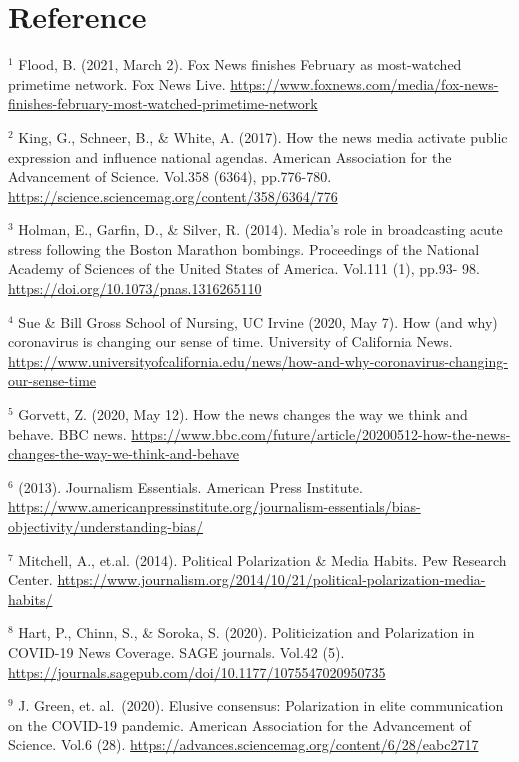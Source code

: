 \documentclass[
]{article}
\begin{document}
\newpage

\hypertarget{reference}{%
\section{Reference}\label{reference}}

\(^1\) Flood, B. (2021, March 2). Fox News finishes February as
most-watched primetime network. Fox News Live.
\url{https://www.foxnews.com/media/fox-news-finishes-february-most-watched-primetime-network}

\(^2\) King, G., Schneer, B., \& White, A. (2017). How the news media
activate public expression and influence national agendas. American
Association for the Advancement of Science. Vol.358 (6364), pp.776-780.
\url{https://science.sciencemag.org/content/358/6364/776}

\(^3\) Holman, E., Garfin, D., \& Silver, R. (2014). Media's role in
broadcasting acute stress following the Boston Marathon bombings.
Proceedings of the National Academy of Sciences of the United States of
America. Vol.111 (1), pp.93- 98.
\url{https://doi.org/10.1073/pnas.1316265110}

\(^4\) Sue \& Bill Gross School of Nursing, UC Irvine (2020, May 7). How
(and why) coronavirus is changing our sense of time. University of
California News.
\url{https://www.universityofcalifornia.edu/news/how-and-why-coronavirus-changing-our-sense-time}

\(^5\) Gorvett, Z. (2020, May 12). How the news changes the way we think
and behave. BBC news.
\url{https://www.bbc.com/future/article/20200512-how-the-news-changes-the-way-we-think-and-behave}

\(^6\) (2013). Journalism Essentials. American Press Institute.
\url{https://www.americanpressinstitute.org/journalism-essentials/bias-objectivity/understanding-bias/}

\(^7\) Mitchell, A., et.al. (2014). Political Polarization \& Media
Habits. Pew Research Center.
\url{https://www.journalism.org/2014/10/21/political-polarization-media-habits/}

\(^8\) Hart, P., Chinn, S., \& Soroka, S. (2020). Politicization and
Polarization in COVID-19 News Coverage. SAGE journals. Vol.42 (5).
\url{https://journals.sagepub.com/doi/10.1177/1075547020950735}

\(^9\) J. Green, et. al.~(2020). Elusive consensus: Polarization in
elite communication on the COVID-19 pandemic. American Association for
the Advancement of Science. Vol.6 (28).
\url{https://advances.sciencemag.org/content/6/28/eabc2717}
\end{document}
